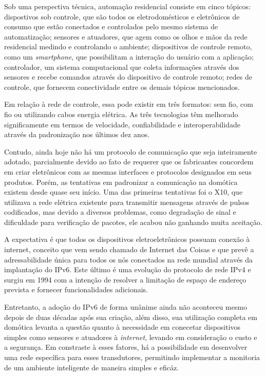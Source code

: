 \documentclass[
    12pt,               %
    a4paper,            %
    english,            %
    brazil,             %
    ]{article}
\begin{document}
Sob uma perspectiva técnica, automação residencial consiste em cinco tópicos: dispostivos sob controle, que são todos os eletrodomésticos e eletrônicos de consumo que estão conectados e controlados
pelo mesmo sistema de automatização; sensores e atuadores, que agem como os olhos e mãos da rede residencial medindo e controlando o ambiente; dispositivos de controle remoto, como um \textit{smartphone},
que possibilitam a interação do usuário com a aplicação; controlador, um sistema computacional que coleta informações através dos sensores e recebe comandos através do dispositivo de controle remoto; redes
de controle, que fornecem conectividade entre os demais tópicos mencionados. \cite{kyas2013}

Em relação à rede de controle, essa pode existir em três formatos: sem fio, com fio ou utilizando cabos energia elétrica. As três tecnologias têm melhorado significamente em termos de velocidade,
confiabilidade e interoperabilidade através da padronização nos últimos dez anos. \cite{kyas2013}

Contudo, ainda hoje não há um protocolo de comunicação que seja inteiramente adotado, parcialmente devido ao fato de requerer que os fabricantes concordem em criar eletrônicos com as
mesmas interfaces e protocolos designados em seus produtos. Porém, as tentativas em padronizar a comunicação na domótica existem desde quase seu início. Uma das primeiras tentativas foi o X10, que
utilizava a rede elétrica existente para transmitir mensagens através de pulsos codificados, mas devido a diversos problemas, como degradação de sinal e dificuldade para verificação de pacotes, ele acabou
não ganhando muita aceitação. \cite{riley2012}

A expectativa é que todos os dispositivos eletroeletrônicos possuam conexão à internet, conceito que vem sendo chamado de  Internet das Coisas e que prevê a adressabilidade única para todos os
nós conectados na rede mundial através da implantação do IPv6. Este último é uma evolução do protocolo de rede IPv4 e surgiu em 1994 com a intenção de resolver a limitação de espaço de endereço prevista e fornecer
funcionalidades adicionais. \cite{hagen2002}

Entretanto, a adoção do IPv6 de forma unânime ainda não aconteceu mesmo depois de duas décadas após sua criação, além disso, sua utilização completa em domótica levanta a questão quanto à necessidade em
conecetar dispositivos simples como sensores e atuadores à \textit{internet}, levando em consideração o custo e a segurança. Em constraste à esses fatores, há a possibilidade em desenvolver uma rede específica para esses transdutores,
permitindo implementar a monitoria de um ambiente inteligente de maneira simples e eficáz.
\end{document}
